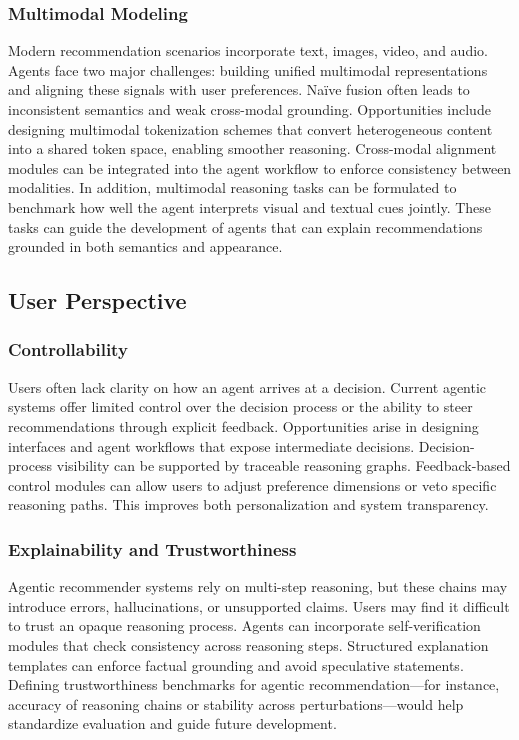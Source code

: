 \subsubsection{Multimodal Modeling}
Modern recommendation scenarios incorporate text, images, video, and audio. Agents face two major challenges: building unified multimodal representations and aligning these signals with user preferences. Naïve fusion often leads to inconsistent semantics and weak cross-modal grounding.
Opportunities include designing multimodal tokenization schemes that convert heterogeneous content into a shared token space, enabling smoother reasoning. Cross-modal alignment modules can be integrated into the agent workflow to enforce consistency between modalities. In addition, multimodal reasoning tasks can be formulated to benchmark how well the agent interprets visual and textual cues jointly. These tasks can guide the development of agents that can explain recommendations grounded in both semantics and appearance.

\subsection{User Perspective}\label{subsec:challenge_user}

\subsubsection{Controllability}
Users often lack clarity on how an agent arrives at a decision. Current agentic systems offer limited control over the decision process or the ability to steer recommendations through explicit feedback.
Opportunities arise in designing interfaces and agent workflows that expose intermediate decisions. Decision-process visibility can be supported by traceable reasoning graphs. Feedback-based control modules can allow users to adjust preference dimensions or veto specific reasoning paths. This improves both personalization and system transparency.

\subsubsection{Explainability and Trustworthiness}
Agentic recommender systems rely on multi-step reasoning, but these chains may introduce errors, hallucinations, or unsupported claims. Users may find it difficult to trust an opaque reasoning process.
Agents can incorporate self-verification modules that check consistency across reasoning steps. Structured explanation templates can enforce factual grounding and avoid speculative statements. Defining trustworthiness benchmarks for agentic recommendation—for instance, accuracy of reasoning chains or stability across perturbations—would help standardize evaluation and guide future development.

